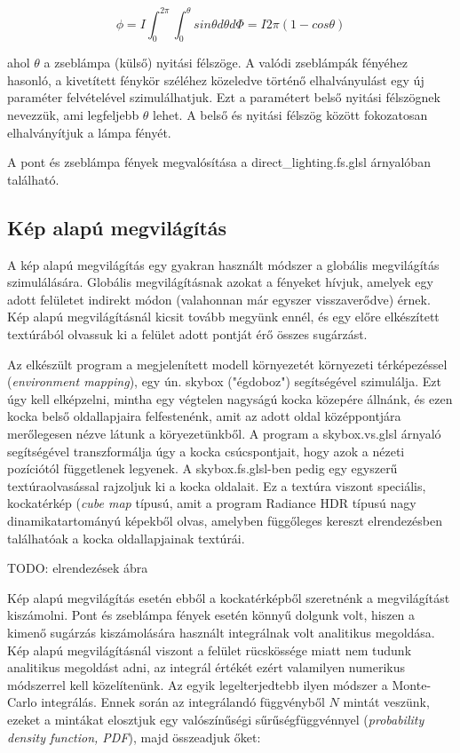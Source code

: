 \[
\phi = I \int_0^{2\pi} { \int_0^\theta { sin\theta d\theta d\Phi } } = I 2\pi (1 - cos\theta)
\]

ahol \(\theta\) a zseblámpa (külső) nyitási félszöge. A valódi zseblámpák fényéhez hasonló, a kivetített fénykör széléhez közeledve történő elhalványulást egy új paraméter felvételével szimulálhatjuk. Ezt a paramétert belső nyitási félszögnek nevezzük, ami legfeljebb \(\theta\) lehet. A belső és nyitási félszög között fokozatosan elhalványítjuk a lámpa fényét.

A pont és zseblámpa fények megvalósítása a direct\_lighting.fs.glsl árnyalóban található.

\subsection{Kép alapú megvilágítás}

A kép alapú megvilágítás egy gyakran használt módszer a globális megvilágítás szimulálására. Globális megvilágításnak azokat a fényeket hívjuk, amelyek egy adott felületet indirekt módon (valahonnan már egyszer visszaverődve) érnek. Kép alapú megvilágításnál kicsit tovább megyünk ennél, és egy előre elkészített textúrából olvassuk ki a felület adott pontját érő összes sugárzást.

Az elkészült program a megjelenített modell környezetét környezeti térképezéssel (\textit{environment mapping}), egy ún. skybox ("égdoboz") segítségével szimulálja. Ezt úgy kell elképzelni, mintha egy végtelen nagyságú kocka közepére állnánk, és ezen kocka belső oldallapjaira felfestenénk, amit az adott oldal középpontjára merőlegesen nézve látunk a köryezetünkből. A program a skybox.vs.glsl árnyaló segítségével transzformálja úgy a kocka csúcspontjait, hogy azok a nézeti pozíciótól függetlenek legyenek. A skybox.fs.glsl-ben pedig egy egyszerű textúraolvasással rajzoljuk ki a kocka oldalait. Ez a textúra viszont speciális, kockatérkép (\textit{cube map} típusú, amit a program Radiance HDR típusú nagy dinamikatartományú képekből olvas, amelyben függőleges kereszt elrendezésben találhatóak a kocka oldallapjainak textúrái.

TODO: elrendezések ábra

Kép alapú megvilágítás esetén ebből a kockatérképből szeretnénk a megvilágítást kiszámolni. Pont és zseblámpa fények esetén könnyű dolgunk volt, hiszen a kimenő sugárzás kiszámolására használt integrálnak volt analitikus megoldása. Kép alapú megvilágításnál viszont a felület rücskössége miatt nem tudunk analitikus megoldást adni, az integrál értékét ezért valamilyen numerikus módszerrel kell közelítenünk. Az egyik legelterjedtebb ilyen módszer a Monte-Carlo integrálás. Ennek során az integrálandó függvényből \(N\) mintát veszünk, ezeket a mintákat elosztjuk egy valószínűségi sűrűségfüggvénnyel (\textit{probability density function, PDF}), majd összeadjuk őket:


